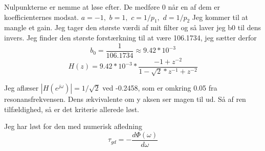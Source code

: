 \begin{Opgaver}
\begin{kapitel}
\begin{Opgave}
\begin{UnderOpgave}
                Nulpunkterne er nemme at løse efter. De medføre 0 når en af dem er koefficienternes modsat. 
                $a = -1, $ 
                $b = 1, $
                $c = 1/p_1, $
                $d = 1/p_2$
                Jeg kommer til at mangle et gain. Jeg tager den største værdi af mit filter og så laver jeg b0 til dens invers. 
                Jeg finder den største forstærkning til at være 106.1734, jeg sætter derfor 
                \[b_0 = \frac{1}{106.1734} \approx 9.42*10^{-3}\]
                \[H(z) = 9.42*10^{-3} * \frac{-1 + z^{-2}}{1 - \sqrt{2}*z^{-1} + z^{-2}}\]
            \end{UnderOpgave}
            \begin{UnderOpgave}
                Jeg aflæser $|H(e^{j\omega})| = 1/\sqrt{2}$ ved -0.2458, som er omkring 0.05 fra resonansfrekvensen. Dens ækvivalente om y aksen ser magen til ud.
                Så af ren tilfældighed, så er det kriterie allerede løst.
            \end{UnderOpgave}
            \begin{UnderOpgave}
                Jeg har løst for den med numerisk afledning
                \[\tau_{gd} = -\frac{d\Phi(\omega)}{d\omega}\]
            \end{UnderOpgave}

            \clearpage



\end{Opgave}
\end{kapitel}
\end{Opgaver}
